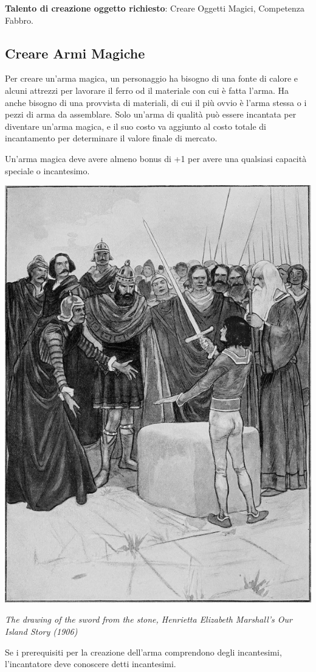 \begin{multicols}{2}
\textbf{Talento di creazione oggetto richiesto}: Creare Oggetti Magici, Competenza Fabbro.

\subsection{Creare Armi Magiche}\label{crearearmimagiche}

Per creare un'arma magica, un personaggio ha bisogno di una fonte di calore e alcuni attrezzi per lavorare il ferro od il materiale con cui è fatta l'arma. Ha anche bisogno di una provvista di materiali, di cui il più ovvio è l'arma stessa o i pezzi di arma da assemblare. Solo un'arma di qualità può essere incantata per diventare un'arma magica, e il suo costo va aggiunto al costo totale di incantamento per determinare il valore finale di mercato.

Un'arma magica deve avere almeno bonus di +1 per avere una qualsiasi capacità speciale o incantesimo.

\medskip

\begin{center}
\includegraphics[width=0.6\linewidth]{immagini/exacaliburfuori.png}

\emph{The drawing of the sword from the stone, Henrietta Elizabeth Marshall's Our Island Story (1906)}
\end{center}

\medskip

Se i prerequisiti per la creazione dell'arma comprendono degli incantesimi, l'incantatore deve conoscere detti incantesimi.


\end{multicols}
